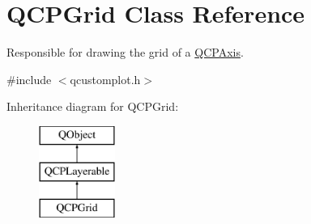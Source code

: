\hypertarget{class_q_c_p_grid}{}\section{Q\+C\+P\+Grid Class Reference}
\label{class_q_c_p_grid}


Responsible for drawing the grid of a \mbox{\hyperlink{class_q_c_p_axis}{Q\+C\+P\+Axis}}.  




{\ttfamily \#include $<$qcustomplot.\+h$>$}

Inheritance diagram for Q\+C\+P\+Grid\+:\begin{figure}[H]
\begin{center}
\leavevmode
\includegraphics[height=3.000000cm]{d2/ddb/class_q_c_p_grid}
\end{center}
\end{figure}
